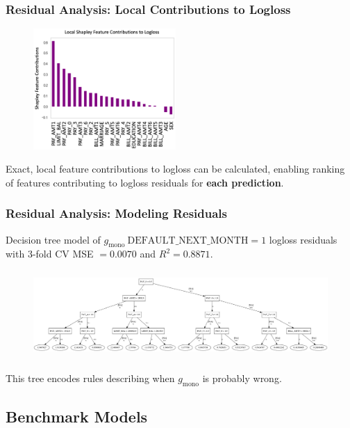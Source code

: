 \documentclass[11pt,
               aspectratio=169,
               hyperref={colorlinks}
               ]{beamer}
\begin{document}
			\begin{frame}
		
				\frametitle{\textbf{Residual Analysis}: Local Contributions to Logloss}
		
				\begin{figure}
					\begin{center}
						\includegraphics[height=130pt]{../img/local.png}
					\end{center}
				\end{figure}	
				Exact, local feature contributions to logloss can be calculated, enabling ranking of features contributing to logloss residuals for \textbf{each prediction}.
			\end{frame}

			\begin{frame}[t]
		
				\frametitle{\textbf{Residual Analysis}: Modeling Residuals}
				Decision tree model of $g_{\text{mono}} ~\text{DEFAULT\_NEXT\_MONTH} =1$ logloss residuals with 3-fold CV MSE $=0.0070$ and $R^2=0.8871$.
				\begin{figure}
					\begin{center}
						\includegraphics[height=95pt, width=330pt]{../img/surrogate_dt_1.png}
					\end{center}
				\end{figure}	
				This tree encodes rules describing when $g_{\text{mono}}$ is probably wrong.
			\end{frame}
			
		\subsection{Benchmark Models}
\end{document}
